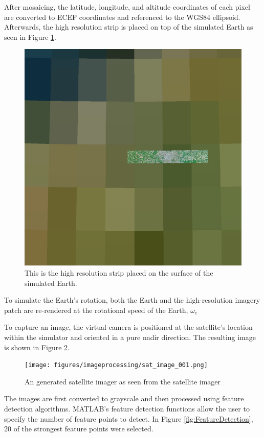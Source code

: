 \noindent
After mosaicing, the latitude, longitude, and altitude coordinates of each pixel are converted to ECEF coordinates and referenced to the 
WGS84 ellipsoid. Afterwards, the high resolution strip is placed on top of the simulated Earth as seen in Figure \ref{fig:HighStrip}.

\begin{figure}[H]
    \centering
    \includegraphics[width=0.4\linewidth]{figures/imageprocessing/HighResImage.png}
    \caption{This is the high resolution strip placed on the surface of the simulated Earth.}
    \label{fig:HighStrip}
\end{figure}

\noindent
To simulate the Earth's rotation, both the Earth and the high-resolution imagery patch are re-rendered at the rotational speed of the Earth, $\omega_e$
\vspace{0.5cm}

\noindent
To capture an image, the virtual camera is positioned at the satellite’s location within the simulator and oriented in a pure nadir direction. The resulting 
image is shown in Figure \ref{fig:GenSatImg}.

\begin{figure}[H]
    \centering
    \texttt{[image: figures/imageprocessing/sat\_image\_001.png]}
    \caption{An generated satellite imager as seen from the satellite imager}
    \label{fig:GenSatImg}
\end{figure}

\label{sec:FeatureDetection}

The images are first converted to grayscale and then processed using feature detection algorithms. MATLAB's feature detection functions allow the user 
to specify the number of feature points to detect. In Figure \ref{fig:FeatureDetection}, 20 of the strongest feature points were selected.
\vspace{0.5cm}

